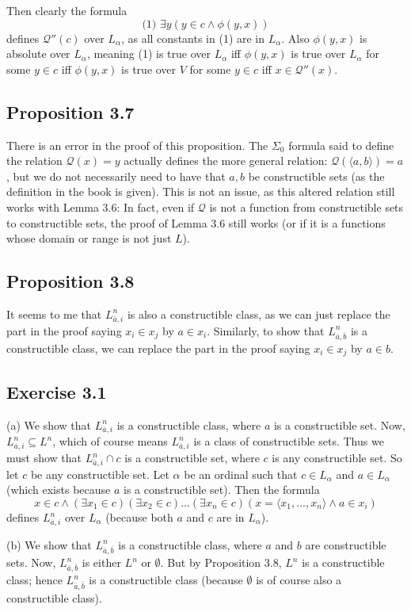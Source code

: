 \documentclass{article}
\theoremstyle{definition}
\begin{document}
Then clearly the formula \[ \textrm{(1) }\exists y(y\in c\wedge \phi(y,x)) \] defines $\mathcal{Q}''(c)$ over $L_\alpha$, as all 
constants in (1) are in $L_\alpha$. Also $\phi(y,x)$ is absolute over $L_\alpha$, meaning (1) is true over $L_\alpha$ iff 
$\phi(y,x)$ is true over $L_\alpha$ for some $y\in c$ iff $\phi(y,x)$ is true over $V$ for some $y\in c$ iff $x\in\mathcal{Q}''(x)$. 

\subsection*{Proposition 3.7}
There is an error in the proof of this proposition. The $\Sigma_0$ formula said to define the relation $\mathcal{Q}(x)=y$ actually 
defines the more general relation: $\mathcal{Q}(\langle a,b\rangle)=a$, but we do not necessarily need to have that $a,b$ be constructible 
sets (as the definition in the book is given). This is not an issue, as this altered relation still works with Lemma 3.6: In fact, even 
if $\mathcal{Q}$ is not a function from constructible sets to constructible sets, the proof of Lemma 3.6 still works (or if it is a functions 
whose domain or range is not just $L$).

\subsection*{Proposition 3.8}
It seems to me that $L^n_{\overline{a},i}$ is also a constructible class, as we can just replace the part in the proof saying 
$x_i\in x_j$ by $a\in x_i$. Similarly, to show that $L^n_{\overline{a},\overline{b}}$ is a constructible class, 
we can replace the part in the proof saying $x_i\in x_j$ by $a\in b$. 

\subsection*{Exercise 3.1}
(a) We show that $L^n_{\overline{a},i}$ is a constructible class, where $a$ is a constructible set. Now, 
$L^n_{\overline{a},i}\subseteq L^n$, which of course means $L^n_{\overline{a},i}$ is a class of constructible sets. Thus we must show that 
$L^n_{\overline{a},i}\cap c$ is a constructible set, where $c$ is any constructible set. So let $c$ be any constructible set. 
Let $\alpha$ be an ordinal such that $c\in L_\alpha$ and $a\in L_\alpha$ (which exists because $a$ is a constructible set). 
Then the formula
\[ x\in c\wedge(\exists x_1\in c)(\exists x_2\in c)...(\exists x_n\in c)(x=\langle x_1,...,x_n\rangle\wedge a\in x_i) \]
defines $L^n_{\overline{a},i}$ over $L_\alpha$ (because both $a$ and $c$ are in $L_\alpha$).

(b) We show that $L^n_{\overline{a},\overline{b}}$ is a constructible class, where $a$ and $b$ are constructible sets. Now, 
$L^n_{\overline{a},\overline{b}}$ is either $L^n$ or $\emptyset$. But by Proposition 3.8, $L^n$ is a constructible class; hence 
$L^n_{\overline{a},\overline{b}}$ is a constructible class (because $\emptyset$ is of course also a constructible class). 
\end{document}
